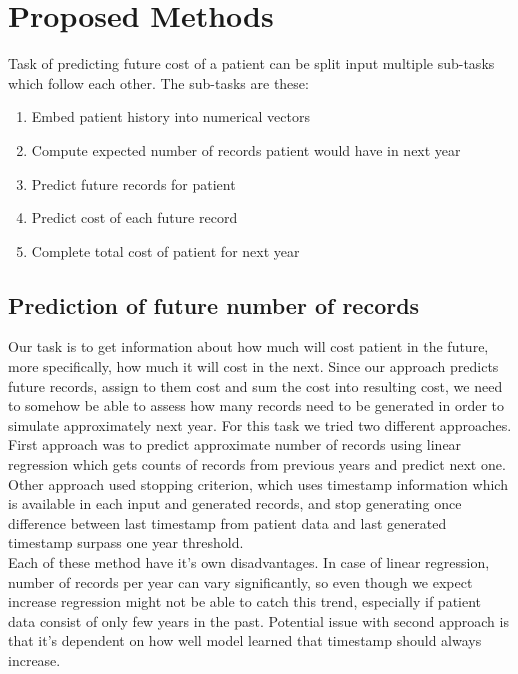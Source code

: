 
\chapter{Proposed Methods}

Task of predicting future cost of a patient can be split input multiple sub-tasks which follow each other. The sub-tasks are these:

\begin{enumerate}
	\item Embed patient history into numerical vectors
	\item Compute expected number of records patient would have in next year
	\item Predict future records for patient
	\item Predict cost of each future record
	\item Complete total cost of patient for next year
\end{enumerate}




\section{Prediction of future number of records}

Our task is to get information about how much will cost patient in the future, more specifically, how much it will cost in the next. Since our approach predicts future records, assign to them cost and sum the cost into resulting cost, we need to somehow be able to assess how many records need to be generated in order to simulate approximately next year. For this task we tried two different approaches.
\\

First approach was to predict approximate number of records using linear regression which gets counts of records from previous years and predict next one. Other approach used stopping criterion, which uses timestamp information which is available in each input and generated records, and stop generating once difference between last timestamp from patient data and last generated timestamp surpass one year threshold.
\\

Each of these method have it's own disadvantages. In case of linear regression, number of records per year can vary significantly, so even though we expect increase \cite{num_of_vis} regression might not be able to catch this trend, especially if patient data consist of only few years in the past. Potential issue with second approach is that it's dependent on how well model learned that timestamp should always increase.  



